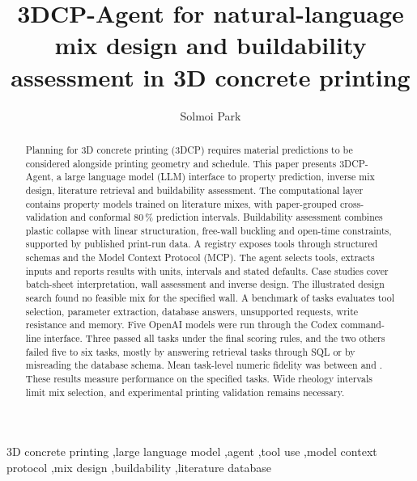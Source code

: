 \documentclass[preprint,12pt]{elsarticle}
\begin{document}
\begin{frontmatter}

\title{3DCP-Agent for natural-language mix design and buildability assessment in 3D concrete printing}

\author[skku]{Solmoi Park}
\address[skku]{School of Civil, Architectural Engineering and Landscape Architecture, Sungkyunkwan University, Suwon, Republic of Korea}

\begin{abstract}
Planning for 3D concrete printing (3DCP) requires material predictions to be considered alongside printing geometry and schedule. This paper presents 3DCP-Agent, a large language model (LLM) interface to property prediction, inverse mix design, literature retrieval and buildability assessment. The computational layer contains \nnModels{} property models trained on \nmixes{} literature mixes, with paper-grouped cross-validation and conformal 80\,\% prediction intervals. Buildability assessment combines plastic collapse with linear structuration, free-wall buckling and open-time constraints, supported by published print-run data. A registry exposes \nnTools{} tools through structured schemas and the Model Context Protocol (MCP). The agent selects tools, extracts inputs and reports results with units, intervals and stated defaults. Case studies cover batch-sheet interpretation, wall assessment and inverse design. The illustrated design search found no feasible mix for the specified wall. A benchmark of \nbenchCxN{} tasks evaluates tool selection, parameter extraction, database answers, unsupported requests, write resistance and memory. Five OpenAI models were run through the Codex command-line interface. Three passed all tasks under the final scoring rules, and the two others failed five to six tasks, mostly by answering retrieval tasks through SQL or by misreading the database schema. Mean task-level numeric fidelity was between \nbenchCuFidelity{} and \nbenchCsFidelity{}. These results measure performance on the specified tasks. Wide rheology intervals limit mix selection, and experimental printing validation remains necessary.
\end{abstract}

\begin{keyword}
3D concrete printing \sep large language model \sep agent \sep tool use \sep model context protocol \sep mix design \sep buildability \sep literature database
\end{keyword}
\end{frontmatter}
\end{document}
